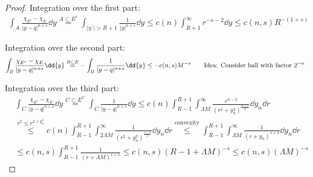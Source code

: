 \begin{proof}
	Integration over the first part:
	\begin{gather*}
		\int_A \frac{\chi_{E^c} -\chi_E}{\lvert y-q\rvert^{n+s}} \dd{y} \overset{A \subset E^c}{ =} \int_{ \lvert y^\prime \rvert > R+1} \frac{1}{\lvert y \rvert^{n+s}} \dd{y} \leq c(n) \int_{R+1}^\infty r^{-s-2} \dd{y} \leq c(n,s) R^{-(1+s)}
	\end{gather*}

	Integration over the second part:
	\begin{gather*}
		\int_B \frac{\chi_{E^c} -\chi_E}{\lvert y-q \rvert^{n+s}} \dd{y} \overset{B \subset E}{ =} - \int_B \frac{1}{\lvert y-q\rvert^{n+s}} \dd{y} \leq -c(n,s) M^{-s} \qquad \text{Idea: Consider ball with factor \( 2^{-n} \)}
	\end{gather*}

	Integration over the third part:
	\begin{align*}
		 & \int_C \frac{\chi_{E^c} -\chi_E}{\lvert y-q\rvert^{n+s}} \dd{y} \overset{C \subset E^C}{ =} \int_C \frac{1}{\lvert y-q\rvert^{n+s}} \dd{y} \leq c(n) \int_{R-1}^{R+1} \int_{\Lambda M}^\infty \frac{r^{n-2}}{(r^2 +y_n^2)^{\frac{n+s}{2}}} \dd{y_n} \dd{r} \\
		 & \overset{r^2 \leq r^{2 + y_n^2}}{ \leq} c(n) \int_{R-1}^{R+1} \int_{2
		\Lambda M}^\infty \frac{1}{(r^2 +y_n^2)^{\frac{s+2}{2}}} \dd{y_n} \dd{r} \overset{\text{convexity}}{\leq} \int_{R-1}^{R+1} \int_{\Lambda M}^\infty \frac{1}{(r+y_n)^{s+2}} \dd{y_n} \dd{r} \\
		 & \leq c(n,s) \int_{R-1}^{R+1} \frac{1}{(r+\Lambda M)^{s+1}} \leq c(n,s)(R-1+\Lambda M)^{-s} \leq c(n,s)(\Lambda M)^{-s}
	\end{align*}


\end{proof}
